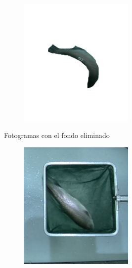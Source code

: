 \begin{enumerate}
\begin{figure}[H]
\begin{subfigure}[b]{\textwidth}
\begin{subfigure}[b]{0.25\textwidth}
                    \label{fig:Vacio3}
                \end{subfigure}
                \begin{subfigure}[b]{0.25\textwidth}
                    \centering
                    \includegraphics[width=0.8\textwidth]{images/6/Vacio4.png}
                    \label{fig:Vacio4}
                \end{subfigure}
                \caption{Fotogramas con el fondo eliminado}
                \label{fig:FotogramasSilueta}
            \end{subfigure}
            \begin{subfigure}[b]{\textwidth}
                \centering
                \begin{subfigure}[b]{0.25\textwidth}
                    \centering
                    \includegraphics[width=0.8\textwidth]{images/6/SinOptical2.png}

\end{subfigure}
\end{subfigure}
\end{figure}
\end{enumerate}
